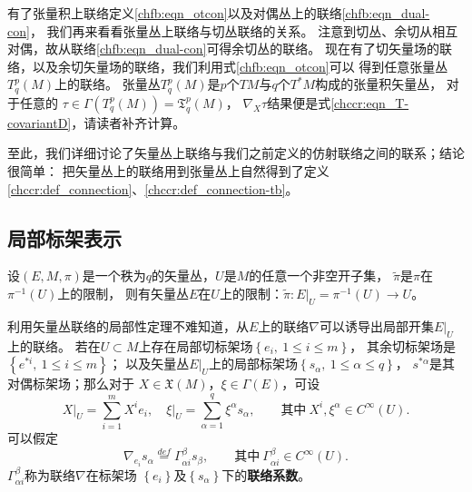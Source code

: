 有了张量积上联络定义\eqref{chfb:eqn_otcon}以及对偶丛上的联络\eqref{chfb:eqn_dual-con}，
我们再来看看张量丛上联络与切丛联络的关系。
注意到切丛、余切从相互对偶，故从联络\eqref{chfb:eqn_dual-con}可得余切丛的联络。
现在有了切矢量场的联络，以及余切矢量场的联络，我们利用式\eqref{chfb:eqn_otcon}可以
得到任意张量丛 $T_q^p(M)$上的联络。
张量丛$T_q^p(M)$是$p$个$TM$与$q$个$T^* M$构成的张量积矢量丛，
对于任意的 $\tau \in \Gamma (T_q^p(M)) =\mathfrak{T}_q^p(M)$，
$\nabla_X \tau$结果便是式\eqref{chccr:eqn_T-covariantD}，请读者补齐计算。


至此，我们详细讨论了矢量丛上联络与我们之前定义的仿射联络之间的联系；结论很简单：
把矢量丛上的联络用到张量丛上自然得到了定义\ref{chccr:def_connection}、\ref{chccr:def_connection-tb}。


\subsection{局部标架表示}\label{chfb:sec_vc}

设$(E,M,\pi)$是一个秩为$q$的矢量丛，$U$是$M$的任意一个非空开子集，
$\tilde{\pi}$是$\pi$在 $\pi^{-1}(U)$上的限制，
则有矢量丛$E$在$U$上的限制：$\tilde{\pi}:\left.E\right|_U=\pi^{-1}(U) \to U$。

利用矢量丛联络的局部性定理不难知道，从$E$上的联络$\nabla$可以诱导出局部开集$\left.E\right|_U$上的联络。
若在$U\subset M$上存在局部切标架场$\left\{e_i,\ 1 \leqslant i \leqslant m\right\}$，
其余切标架场是$\left\{e^{*i},\ 1 \leqslant i \leqslant m\right\}$；
以及矢量丛$\left.E\right|_U$上的局部标架场$\left\{s_\alpha,\ 1 \leqslant \alpha \leqslant q\right\}$，
$s^{*\alpha}$是其对偶标架场；那么对于 $X \in \mathfrak{X}(M)$，$ \xi \in \Gamma(E)$，可设
\begin{equation*}
    \left.X\right|_U= \sum_{i=1}^{m}X^i e_i,\left.\quad 
    \xi\right|_U= \sum_{\alpha=1}^{q}\xi^\alpha s_\alpha,
    \qquad \text{其中} \  X^i, \xi^\alpha \in C^{\infty}(U) .
\end{equation*}
可以假定
\begin{equation}\label{chfb:eqn_con-Gamma}
    \nabla_{e_i} s_\alpha \overset{def}{=} \Gamma_{\alpha i}^\beta s_\beta,
    \qquad \text{其中}\  \Gamma_{\alpha i}^\beta \in C^{\infty}(U). 
\end{equation}
$\Gamma_{\alpha i}^\beta$称为联络$\nabla$在标架场
$\left\{e_i\right\}$及$\left\{s_\alpha\right\}$下的\textbf{联络系数}。 

